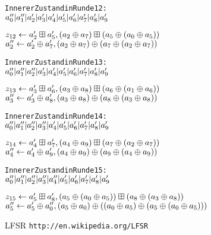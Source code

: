\documentclass[a4paper,12pt]{article}
\begin{document}
\begin{appendix}
\begin{alltt}
Innerer Zustand in Runde 12:
\( a''\sb{0} | a''\sb{1} | a'\sb{2} | a'\sb{3} | a'\sb{4} | a'\sb{5} | a'\sb{6} | a'\sb{7} | a'\sb{8} | a'\sb{9} \)

\( z\sb{12} \leftarrow a'\sb{2} \boxplus a'\sb{5} , (a\sb{2} \oplus a\sb{7}) \boxplus (a\sb{5} \oplus (a\sb{0} \oplus a\sb{5})) \)
\( a''\sb{2} \leftarrow a'\sb{2} \oplus a'\sb{7} , (a\sb{2} \oplus a\sb{7}) \oplus (a\sb{7} \oplus (a\sb{2} \oplus a\sb{7})) \) 

Innerer Zustand in Runde 13:
\( a''\sb{0} | a''\sb{1} | a''\sb{2} | a'\sb{3} | a'\sb{4} | a'\sb{5} | a'\sb{6} | a'\sb{7} | a'\sb{8} | a'\sb{9} \)

\( z\sb{13} \leftarrow a'\sb{3} \boxplus a'\sb{6} , (a\sb{3} \oplus a\sb{8}) \boxplus (a\sb{6} \oplus (a\sb{1} \oplus a\sb{6})) \)
\( a''\sb{3} \leftarrow a'\sb{3} \oplus a'\sb{8} , (a\sb{3} \oplus a\sb{8}) \oplus (a\sb{8} \oplus (a\sb{3} \oplus a\sb{8})) \) 

Innerer Zustand in Runde 14:
\( a''\sb{0} | a''\sb{1} | a''\sb{2} | a''\sb{3} | a'\sb{4} | a'\sb{5} | a'\sb{6} | a'\sb{7} | a'\sb{8} | a'\sb{9} \)

\( z\sb{14} \leftarrow a'\sb{4} \boxplus a'\sb{7} , (a\sb{4} \oplus a\sb{9}) \boxplus (a\sb{7} \oplus (a\sb{2} \oplus a\sb{7})) \)
\( a''\sb{4} \leftarrow a'\sb{4} \oplus a'\sb{9} , (a\sb{4} \oplus a\sb{9}) \oplus (a\sb{9} \oplus (a\sb{4} \oplus a\sb{9})) \) 

Innerer Zustand in Runde 15:
\( a''\sb{0} | a''\sb{1} | a''\sb{2} | a''\sb{3} | a''\sb{4} | a'\sb{5} | a'\sb{6} | a'\sb{7} | a'\sb{8} | a'\sb{9} \)

\( z\sb{15} \leftarrow a'\sb{5} \boxplus a'\sb{8} , (a\sb{5} \oplus (a\sb{0} \oplus a\sb{5})) \boxplus (a\sb{8} \oplus (a\sb{3} \oplus a\sb{8})) \)
\( a''\sb{5} \leftarrow a'\sb{5} \oplus a''\sb{0} , (a\sb{5} \oplus a\sb{0}) \oplus ((a\sb{0} \oplus a\sb{5}) \oplus (a\sb{5} \oplus (a\sb{0} \oplus a\sb{5}))) \) 
\end{alltt}

\end{appendix}

\newpage


\nocite{*}
\begin{thebibliography}{15}
LFSR \nolinkurl{http://en.wikipedia.org/LFSR}

\end{thebibliography}
\end{document}
